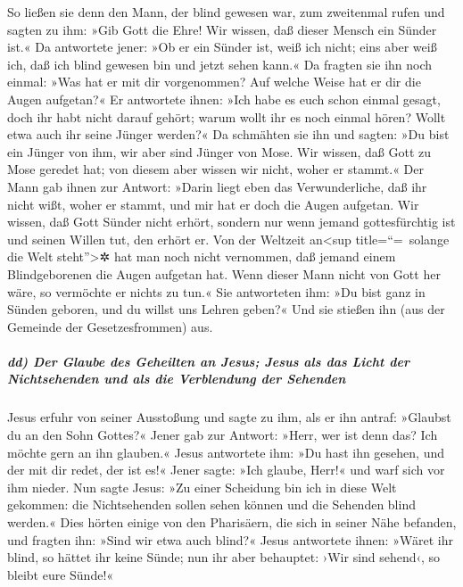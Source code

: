  So ließen sie denn den Mann, der blind gewesen war, zum
zweitenmal rufen und sagten zu ihm: »Gib Gott die Ehre! Wir wissen, daß
dieser Mensch ein Sünder ist.«  Da antwortete jener: »Ob
er ein Sünder ist, weiß ich nicht; eins aber weiß ich, daß ich blind
gewesen bin und jetzt sehen kann.«  Da fragten sie ihn
noch einmal: »Was hat er mit dir vorgenommen? Auf welche Weise hat er
dir die Augen aufgetan?«  Er antwortete ihnen: »Ich habe
es euch schon einmal gesagt, doch ihr habt nicht darauf gehört; warum
wollt ihr es noch einmal hören? Wollt etwa auch ihr seine Jünger
werden?«  Da schmähten sie ihn und sagten: »Du bist ein
Jünger von ihm, wir aber sind Jünger von Mose.  Wir
wissen, daß Gott zu Mose geredet hat; von diesem aber wissen wir nicht,
woher er stammt.«  Der Mann gab ihnen zur Antwort: »Darin
liegt eben das Verwunderliche, daß ihr nicht wißt, woher er stammt, und
mir hat er doch die Augen aufgetan.  Wir wissen, daß Gott
Sünder nicht erhört, sondern nur wenn jemand gottesfürchtig ist und
seinen Willen tut, den erhört er.  Von der Weltzeit
an\textless sup title=``=~solange die Welt steht''\textgreater✲ hat man
noch nicht vernommen, daß jemand einem Blindgeborenen die Augen aufgetan
hat.  Wenn dieser Mann nicht von Gott her wäre, so
vermöchte er nichts zu tun.«  Sie antworteten ihm: »Du
bist ganz in Sünden geboren, und du willst uns Lehren geben?« Und sie
stießen ihn (aus der Gemeinde der Gesetzesfrommen) aus.

\hypertarget{dd-der-glaube-des-geheilten-an-jesus-jesus-als-das-licht-der-nichtsehenden-und-als-die-verblendung-der-sehenden}{%
\subparagraph{dd) Der Glaube des Geheilten an Jesus; Jesus als das Licht
der Nichtsehenden und als die Verblendung der
Sehenden}\label{dd-der-glaube-des-geheilten-an-jesus-jesus-als-das-licht-der-nichtsehenden-und-als-die-verblendung-der-sehenden}}

 Jesus erfuhr von seiner Ausstoßung und sagte zu ihm, als
er ihn antraf: »Glaubst du an den Sohn Gottes?«  Jener
gab zur Antwort: »Herr, wer ist denn das? Ich möchte gern an ihn
glauben.«  Jesus antwortete ihm: »Du hast ihn gesehen,
und der mit dir redet, der ist es!«  Jener sagte: »Ich
glaube, Herr!« und warf sich vor ihm nieder.  Nun sagte
Jesus: »Zu einer Scheidung bin ich in diese Welt gekommen: die
Nichtsehenden sollen sehen können und die Sehenden blind werden.«
 Dies hörten einige von den Pharisäern, die sich in
seiner Nähe befanden, und fragten ihn: »Sind wir etwa auch blind?«
 Jesus antwortete ihnen: »Wäret ihr blind, so hättet ihr
keine Sünde; nun ihr aber behauptet: ›Wir sind sehend‹, so bleibt eure
Sünde!«

